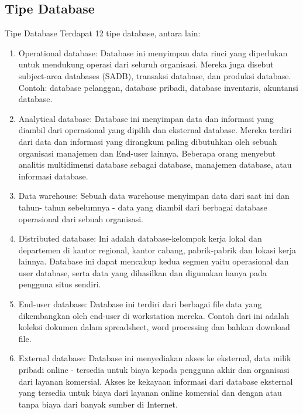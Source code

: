 \subsection{Tipe Database} 
Tipe Database Terdapat 12 tipe database, antara lain: 
\begin{enumerate}
\item Operational database: Database ini menyimpan data rinci yang diperlukan untuk mendukung operasi dari seluruh organisasi. Mereka juga disebut subject-area databases (SADB), transaksi database, dan produksi database. Contoh: database pelanggan, database pribadi, database inventaris, akuntansi database.
 
\item Analytical database: Database ini menyimpan data dan informasi yang diambil dari operasional yang dipilih dan eksternal database. Mereka terdiri dari data dan informasi yang dirangkum paling dibutuhkan oleh sebuah organisasi manajemen dan End-user lainnya. Beberapa orang menyebut analitis multidimensi database sebagai database, manajemen database, atau informasi database. \par
\noindent 
\item Data warehouse: Sebuah data warehouse menyimpan data dari saat ini dan tahun- tahun sebelumnya - data yang diambil dari berbagai database operasional dari sebuah organisasi.
\noindent 
\item Distributed database: Ini adalah database-kelompok kerja lokal dan departemen di kantor regional, kantor cabang, pabrik-pabrik dan lokasi kerja lainnya. Database ini dapat mencakup kedua segmen yaitu operasional dan user database, serta data yang dihasilkan dan digunakan hanya pada pengguna situs sendiri. 
 
\item End-user database: Database ini terdiri dari berbagai file data yang dikembangkan oleh end-user di workstation mereka. Contoh dari ini adalah koleksi dokumen dalam spreadsheet, word processing dan bahkan download file. 

\item External database: Database ini menyediakan akses ke eksternal, data milik pribadi online - tersedia untuk biaya kepada pengguna akhir dan organisasi dari layanan komersial. Akses ke kekayaan informasi dari database eksternal yang tersedia untuk biaya dari layanan online komersial dan dengan atau tanpa biaya dari banyak sumber di Internet.


\end{enumerate}
